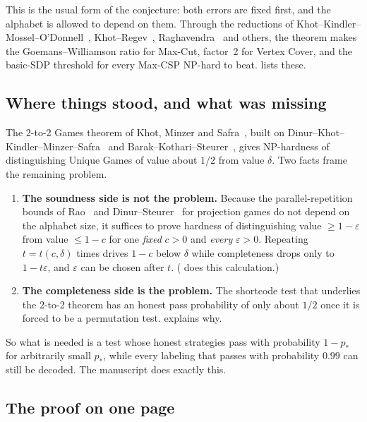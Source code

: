 \documentclass[11pt]{article}
\theoremstyle{definition}
\theoremstyle{remark}
\newcommand{\eps}{\varepsilon}
\begin{document}
This is the usual form of the conjecture: both errors are fixed first, and
the alphabet is allowed to depend on them. Through the reductions of
Khot--Kindler--Mossel--O'Donnell~\cite{KKMO07}, Khot--Regev~\cite{KhotRegev},
Raghavendra~\cite{Raghavendra08} and others, the theorem makes the
Goemans--Williamson ratio for Max-Cut, factor~2 for Vertex Cover, and the
basic-SDP threshold for every Max-CSP NP-hard to beat. 
lists these.

\subsection{Where things stood, and what was missing}

The 2-to-2 Games theorem of Khot, Minzer and Safra~\cite{KMS17,KMS23}, built on
Dinur--Khot--Kindler--Minzer--Safra~\cite{DKKMS} and
Barak--Kothari--Steurer~\cite{BKS18}, gives NP-hardness of distinguishing
Unique Games of value about $1/2$ from value $\delta$. Two facts frame
the remaining problem.

\begin{enumerate}
\item \textbf{The soundness side is not the problem.} Because the
  parallel-repetition bounds of Rao~\cite{Rao11} and
  Dinur--Steurer~\cite{DS14} for projection games do not depend on the
  alphabet size, it suffices to prove hardness of distinguishing value
  $\ge1-\eps$ from value $\le 1-c$ for one \emph{fixed} $c>0$ and \emph{every}
  $\eps>0$. Repeating $t=t(c,\delta)$ times drives $1-c$ below $\delta$ while
  completeness drops only to $1-t\eps$, and $\eps$ can be chosen after $t$.
  ( does this calculation.)
\item \textbf{The completeness side is the problem.} The shortcode test that
  underlies the 2-to-2 theorem has an honest pass probability of only about
  $1/2$ once it is forced to be a permutation test. 
  explains why.
\end{enumerate}

So what is needed is a test whose honest strategies pass with probability
$1-p_*$ for arbitrarily small $p_*$, while every labeling that passes with
probability $0.99$ can still be decoded. The manuscript does exactly this.

\subsection{The proof on one page}\label{sec:onepage}
\end{document}
